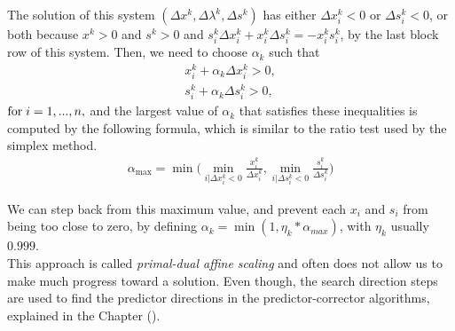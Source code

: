 \documentclass[a4paper,10 pt,titlepage,twoside]{book}
\theoremstyle{plain}
\theoremstyle{definition}
\theoremstyle{remark}
\begin{document}
The solution of this system $\left(\Delta x^{k},\Delta\lambda^{k},\Delta s^{k}\right)$ has either $\Delta x_{i}^{k}<0$ or $\Delta s_{i}^{k}<0$, or both because $x^{k}>0$ and $s^{k}>0$ and $s^{k}_{i}\Delta x^{k}_{i} + x^{k}_{i}\Delta s^{k}_{i} = - x^{k}_{i}s^{k}_{i}$, by the last block row of this system.
Then, we need to choose $\alpha_{k}$ such that
\begin{align*}
x^{k}_{i} + \alpha_{k} \Delta x^{k}_{i} >0, \\
s^{k}_{i} + \alpha_{k} \Delta s^{k}_{i} >0,	
\end{align*}
$\text{for\;} i = 1,...,n,$ and the largest value of $\alpha_{k}$ that satisfies these inequalities is computed by the following formula, which is similar to the ratio test used by the simplex method. 
\begin{align*}
\alpha_{\text{max}} = \min\bigg(\min_{i|\Delta x^{k}_{i}<0}\frac{x^{k}_{i}}{\Delta x^{k}_{i}}, \min_{i|\Delta s^{k}_{i}<0}\frac{s^{k}_{i}}{\Delta s^{k}_{i}}\bigg)
\end{align*} 

We can step back from this maximum value, and prevent each $x_{i}$ and $s_{i}$ from being too close to zero, by defining $\alpha_{k} = \min\left(1,\eta_{k}*\alpha_{max}\right)$, with $\eta_{k}$ usually $0.999$.\\
This approach is called \textit{primal-dual affine scaling} and often does not allow us to make much progress toward a solution. 
Even though, the search direction steps are used to find the predictor directions in the predictor-corrector algorithms, explained in the Chapter ().
\end{document}
